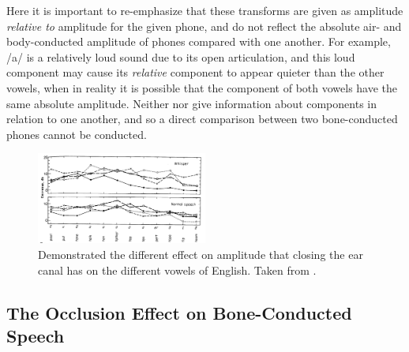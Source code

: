 Here it is important to re-emphasize that these transforms are given as \DIFdelbegin {}\DIFdelend \DIFaddbegin {}\DIFaddend amplitude \textit{relative to} \DIFdelbegin {}\DIFdelend \DIFaddbegin {}\DIFaddend amplitude for the given phone, and do not reflect the absolute air- and body-conducted amplitude of phones compared with one another.  For example, /a/ is a relatively loud \DIFdelbegin {}\DIFdelend \DIFaddbegin {}\DIFaddend sound due to its open articulation, and this loud \DIFdelbegin {}\DIFdelend \DIFaddbegin {}\DIFaddend component may cause its \textit{relative} \DIFdelbegin {}\DIFdelend \DIFaddbegin {}\DIFaddend component to appear quieter than the other vowels, when in reality it is possible that the \DIFdelbegin {}\DIFdelend \DIFaddbegin {}\DIFaddend component of both vowels have the same absolute amplitude.  Neither \cite{bekesy:60} nor \cite{reinfeldt:10} give information about \DIFdelbegin {}\DIFdelend \DIFaddbegin {}\DIFaddend components in relation to one another, and so a direct comparison between two bone-conducted phones cannot be conducted.


\begin{figure}
\includegraphics[width=0.5\textwidth]{figure/bekesy60-3.png}
\caption{Demonstrated the different effect on amplitude that closing the ear canal has on the different vowels of English.  Taken from \cite{bekesy:60}.}
\label{bekesyPhoneDiff}
\end{figure}

\DIFdelbegin %
\DIFdelend \DIFaddbegin \subsection{The Occlusion Effect on Bone-Conducted Speech}\label{sec:OEBCspeech}
\DIFaddend 

